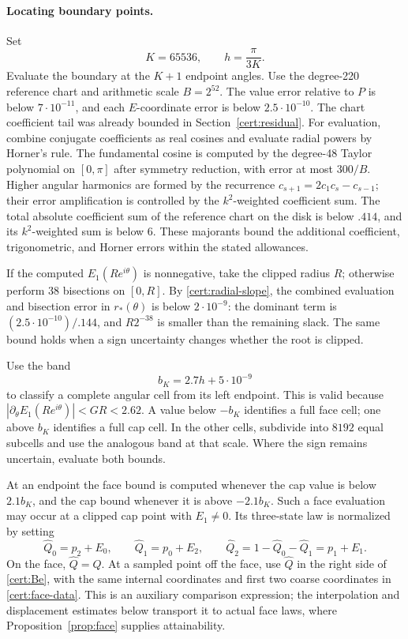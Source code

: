 \paragraph{Locating boundary points.}
Set
\[
 K=65536,\qquad h=\frac{\pi}{3K}.
\]
Evaluate the boundary at the $K+1$ endpoint angles.  Use the degree-220
reference chart and arithmetic scale $B=2^{52}$.  The value error relative
to $P$ is below $7\cdot10^{-11}$, and each $E$-coordinate error is below
$2.5\cdot10^{-10}$.  The chart coefficient tail was already bounded in
Section~\ref{cert:residual}.  For evaluation, combine conjugate coefficients
as real cosines and evaluate radial powers by Horner's rule.  The fundamental cosine is computed by the degree-48 Taylor polynomial
on $[0,\pi]$ after symmetry reduction, with error at most $300/B$.
Higher angular harmonics are formed by the recurrence
$c_{s+1}=2c_1c_s-c_{s-1}$; their error amplification is controlled by
the $k^2$-weighted coefficient sum.  The total absolute coefficient
sum of the reference chart on the disk is below $.414$, and its
$k^2$-weighted sum is below 6.  These majorants bound the additional
coefficient, trigonometric, and Horner errors within the stated
allowances.

If the computed $E_1(Re^{i\theta})$ is nonnegative, take the clipped
radius $R$; otherwise perform 38 bisections on $[0,R]$.  By
\eqref{cert:radial-slope}, the combined evaluation and bisection error in
$r_*(\theta)$ is below $2\cdot10^{-9}$: the dominant term is
$(2.5\cdot10^{-10})/.144$, and $R2^{-38}$ is smaller than the remaining
slack.  The same bound holds when a sign uncertainty changes whether the
root is clipped.

Use the band
\begin{equation}\label{cert:band}
 b_K=2.7h+5\cdot10^{-9}
\end{equation}
to classify a complete angular cell from its left endpoint.  This is
valid because $|\partial_\theta E_1(Re^{i\theta})|<GR<2.62$.  A value
below $-b_K$ identifies a full face cell; one above $b_K$ identifies a
full cap cell.  In the other cells, subdivide into $8192$ equal subcells
and use the analogous band at that scale.  Where the sign remains
uncertain, evaluate both bounds.

At an endpoint the face bound is computed whenever the cap value is
below $2.1b_K$, and the cap bound whenever it is above $-2.1b_K$.
Such a face evaluation may occur at a clipped cap point with $E_1\ne0$.
Its three-state law is normalized by setting
\[
 \widehat Q_0=p_2+E_0,\qquad
 \widehat Q_1=p_0+E_2,\qquad
 \widehat Q_2=1-\widehat Q_0-\widehat Q_1=p_1+E_1.
\]
On the face, $\widehat Q=Q$.  At a sampled point off the face, use
$\widehat Q$ in the right side of \eqref{cert:Be}, with the same
internal coordinates and first two coarse coordinates in
\eqref{cert:face-data}.  This is an auxiliary comparison expression;
the interpolation and displacement estimates below transport it to actual
face laws, where Proposition~\ref{prop:face} supplies attainability.

